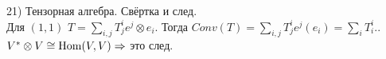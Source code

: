 21) Тензорная алгебра. Свёртка и след.\\
Для $(1, 1)$ $T=\sum_{i,j} T_j^i e^j\otimes e_i$. Тогда $Conv(T)=\sum_{i,j} T_j^i e^j(e_i)=\sum_i T^i_i.$. $V^*\otimes V \cong \operatorname{Hom}(V,V)\Rightarrow$ это след.
